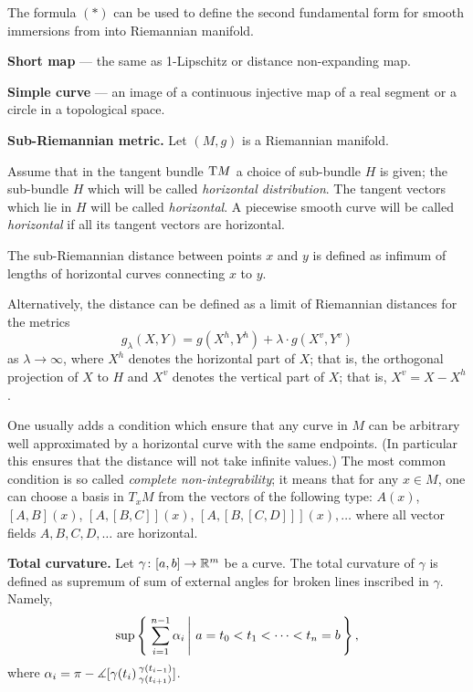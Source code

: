 \begin{description}
The formula $({*})$ can be used to define the second fundamental form for smooth immersions from into Riemannian manifold.

\item{\bf Short map}\label{Short map} --- the same as 1-Lipschitz 
or distance non-expanding map.

\item{\bf Simple curve}\label{Simple curve} --- an image of a continuous injective map of a real segment or a circle in a topological space.

\item{\bf Sub-Riemannian metric.}\label{Sub-Riemannian metric}
Let $(M,g)$ is a Riemannian manifold.

Assume that in the tangent bundle $\mathrm{T} M$ 
a choice of sub-bundle $H$ is given;
the sub-bundle $H$ which will be called  \emph{horizontal distribution}.
The tangent vectors which lie in $H$ will be called \emph{horizontal}.
A piecewise smooth curve will be called \emph{horizontal}
if all its tangent vectors are horizontal.

The sub-Riemannian distance between points $x$ and $y$ is defined as infimum of lengths of horizontal curves connecting $x$ to $y$.

Alternatively, the distance can be defined as a limit of Riemannian distances 
for the metrics 
\[g_\lambda(X,Y)=g(X^h,Y^h)+\lambda\cdot g(X^v,Y^v)\] 
as $\lambda\to \infty$,
where $X^h$ denotes the horizontal part of $X$;
that is, the orthogonal projection of $X$ to $H$
and $X^v$ denotes the vertical part of $X$;
that is, $X^v=X-X^h$.

One usually adds a condition which ensure that any curve in $M$ can be arbitrary well approximated by a horizontal curve with the same endpoints.
(In particular this ensures that the distance will not take infinite values.)
The most common condition is so called  \emph{complete non-integrability};
it means that for any $x\in M$, 
one can choose a basis in $T_xM$
from the vectors of the following type:
$A(x)$, $[A,B](x)$, $[A,[B,C]](x)$, $[A,[B,[C,D]]](x),\dots$ where all vector fields $A,B,C,D, \dots$ are horizontal.


\item{\bf Total curvature.}
\label{Total curvature} 
Let $\gamma\colon[a,b]\to\mathbb{R}^m$ be a curve.
The total curvature of $\gamma$ is defined as supremum of sum of external angles for broken lines inscribed in $\gamma$. 
Namely, 
$$\sup\set{\sum_{i=1}^{n-1}\alpha_i}{a=t_0<t_1<\dots<t_n=b},$$
where $\alpha_i=\pi-\measuredangle [\gamma(t_{i})\,{}^{\gamma(t_{i-1})}_{\gamma(t_{i+1})}]$.


\end{description}
